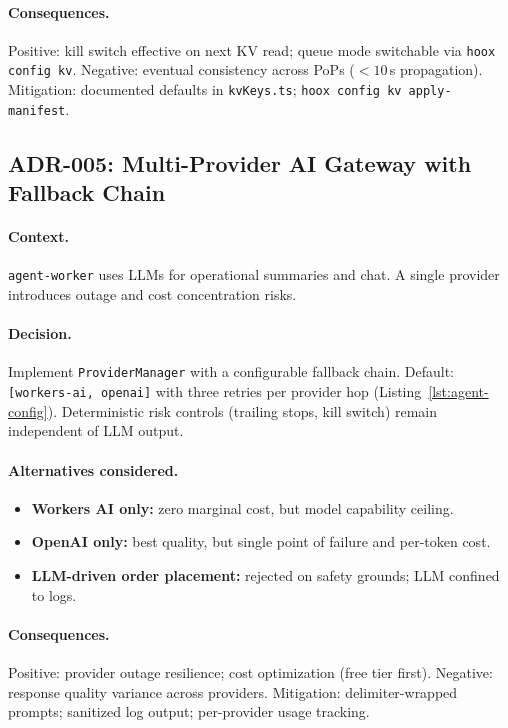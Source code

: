 \paragraph{Consequences.} Positive: kill switch effective on next KV read; queue mode switchable via \texttt{hoox config kv}. Negative: eventual consistency across PoPs (${<}10$\,s propagation). Mitigation: documented defaults in \texttt{kvKeys.ts}; \texttt{hoox config kv apply-manifest}.

\subsection{ADR-005: Multi-Provider AI Gateway with Fallback Chain}

\paragraph{Context.} \texttt{agent-worker} uses LLMs for operational summaries and chat. A single provider introduces outage and cost concentration risks.

\paragraph{Decision.} Implement \texttt{ProviderManager} with a configurable fallback chain. Default: \texttt{[workers-ai, openai]} with three retries per provider hop (Listing~\ref{lst:agent-config}). Deterministic risk controls (trailing stops, kill switch) remain independent of LLM output.

\paragraph{Alternatives considered.}
\begin{itemize}
  \item \textbf{Workers AI only:} zero marginal cost, but model capability ceiling.
  \item \textbf{OpenAI only:} best quality, but single point of failure and per-token cost.
  \item \textbf{LLM-driven order placement:} rejected on safety grounds; LLM confined to logs.
\end{itemize}

\paragraph{Consequences.} Positive: provider outage resilience; cost optimization (free tier first). Negative: response quality variance across providers. Mitigation: delimiter-wrapped prompts; sanitized log output; per-provider usage tracking.


